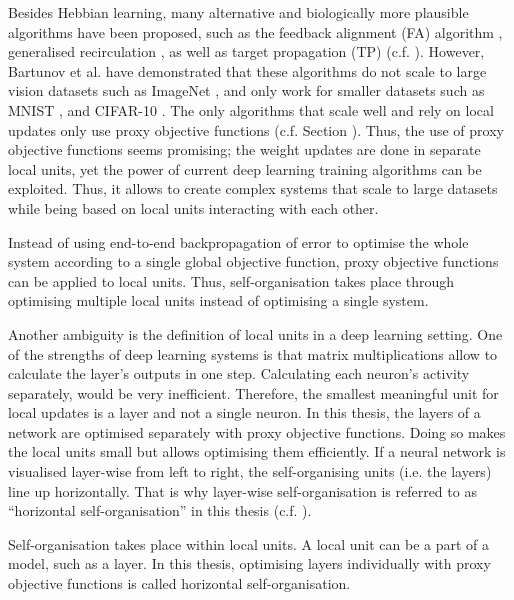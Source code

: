 Besides Hebbian learning, many alternative and biologically more plausible algorithms have been proposed, such as the feedback alignment (FA) algorithm , generalised recirculation , as well as target propagation (TP)  (c.f. ).
However, Bartunov et al.  have demonstrated that these algorithms do not scale to large vision datasets such as ImageNet \cite{deng2009imagenet}, and only work for smaller datasets such as MNIST \cite{MNIST}, and CIFAR-10 \cite{cifar_10}.
The only algorithms that scale well and rely on local updates only use proxy objective functions (c.f. Section ).
Thus, the use of proxy objective functions seems promising; the weight updates are done in separate local units, yet the power of current deep learning training algorithms can be exploited. Thus, it allows to create complex systems that scale to large datasets while being based on local units interacting with each other.

\begin{implementation}
	Instead of using end-to-end backpropagation of error to optimise the whole system according to a single global objective function, proxy objective functions can be applied to local units. Thus, self-organisation takes place through optimising multiple local units instead of optimising a single system.
\end{implementation}

Another ambiguity is the definition of local units in a deep learning setting.
One of the strengths of deep learning systems is that matrix multiplications allow to calculate the layer's outputs in one step.
Calculating each neuron's activity separately, would be very inefficient.
Therefore, the smallest meaningful unit for local updates is a layer and not a single neuron.
In this thesis, the layers of a network are optimised separately with proxy objective functions. Doing so makes the local units small but allows optimising them efficiently.
If a neural network is visualised layer-wise from left to right, the self-organising units (i.e. the layers) line up horizontally. That is why layer-wise self-organisation is referred to as ``horizontal self-organisation'' in this thesis (c.f. ).

\begin{implementation}
	Self-organisation takes place within local units. A local unit can be a part of a model, such as a layer.
	In this thesis,  optimising layers individually with proxy objective functions is called horizontal self-organisation.
\end{implementation}


